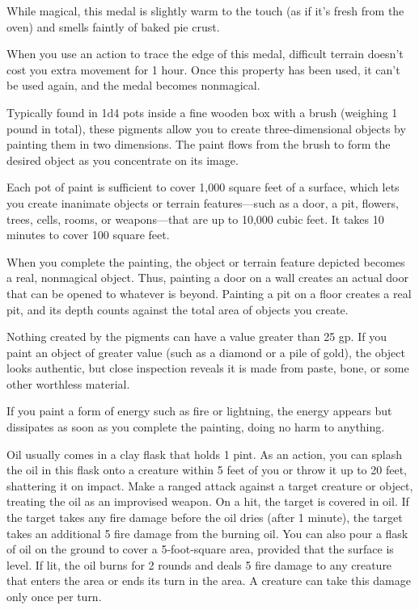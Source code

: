 \documentclass[10pt,a4paper,twoside,fancy,bg=print,twocolumn,openany,nodeprecatedcode]{dndbook}
\begin{document}
While magical, this medal is slightly warm to the touch (as if it's fresh from the oven) and smells faintly of baked pie crust.

When you use an action to trace the edge of this medal, difficult terrain doesn't cost you extra movement for 1 hour. Once this property has been used, it can't be used again, and the medal becomes nonmagical.

Typically found in 1d4 pots inside a fine wooden box with a brush (weighing 1 pound in total), these pigments allow you to create three-dimensional objects by painting them in two dimensions. The paint flows from the brush to form the desired object as you concentrate on its image.

Each pot of paint is sufficient to cover 1,000 square feet of a surface, which lets you create inanimate objects or terrain features—such as a door, a pit, flowers, trees, cells, rooms, or weapons—that are up to 10,000 cubic feet. It takes 10 minutes to cover 100 square feet.

When you complete the painting, the object or terrain feature depicted becomes a real, nonmagical object. Thus, painting a door on a wall creates an actual door that can be opened to whatever is beyond. Painting a pit on a floor creates a real pit, and its depth counts against the total area of objects you create.

Nothing created by the pigments can have a value greater than 25 gp. If you paint an object of greater value (such as a diamond or a pile of gold), the object looks authentic, but close inspection reveals it is made from paste, bone, or some other worthless material.

If you paint a form of energy such as fire or lightning, the energy appears but dissipates as soon as you complete the painting, doing no harm to anything.

Oil usually comes in a clay flask that holds 1 pint. As an action, you can splash the oil in this flask onto a creature within 5 feet of you or throw it up to 20 feet, shattering it on impact. Make a ranged attack against a target creature or object, treating the oil as an improvised weapon. On a hit, the target is covered in oil. If the target takes any fire damage before the oil dries (after 1 minute), the target takes an additional 5 fire damage from the burning oil. You can also pour a flask of oil on the ground to cover a 5-foot-square area, provided that the surface is level. If lit, the oil burns for 2 rounds and deals 5 fire damage to any creature that enters the area or ends its turn in the area. A creature can take this damage only once per turn.
\end{document}
